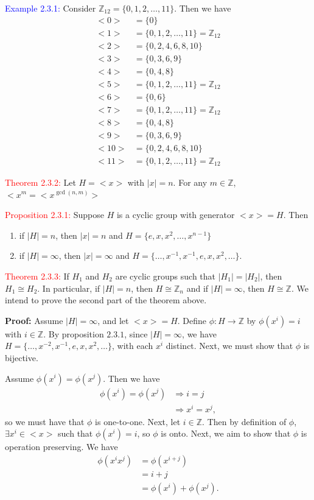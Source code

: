 \documentclass{article}
\begin{document}
\textcolor{blue}{Example 2.3.1:} Consider $\mathbb{Z}_{12} = \{0,1,2, \dots, 11\}$. Then we have
\begin{align*}
    <0> &= \{0\} \\
    <1> &= \{0,1,2, \dots, 11\} = \mathbb{Z}_{12} \\
    <2> &= \{0,2,4,6,8,10\} \\
    <3> &= \{0,3,6,9\} \\
    <4> &= \{0,4,8\} \\
    <5> &= \{0,1,2, \dots, 11\} = \mathbb{Z}_{12} \\
    <6> &= \{0,6\} \\
    <7> &= \{0,1,2, \dots, 11\} = \mathbb{Z}_{12} \\
    <8> &= \{0,4,8\} \\
    <9> &= \{0,3,6,9\} \\
    <10> &= \{0,2,4,6,8,10\} \\
    <11> &= \{0,1,2, \dots, 11\} = \mathbb{Z}_{12}
\end{align*}

\textcolor{red}{Theorem 2.3.2:} Let $H = <x>$ with $|x|=n$. For any $m \in \mathbb{Z}$, $<x^m = <x^{\gcd(n,m)}>$

\textcolor{red}{Proposition 2.3.1:} Suppose $H$ is a cyclic group with generator $<x>=H$. Then
\begin{enumerate}
    \item if $|H| = n$, then $|x| = n$ and $H = \{e,x,x^2, \dots, x^{n-1}\}$
    \item if $|H| = \infty$, then $|x| = \infty$ and $H = \{ \dots, x^{-1}, x^{-1}, e,x,x^2, \dots \}$.
\end{enumerate}

\textcolor{red}{Theorem 2.3.3:} If $H_1$ and $H_2$ are cyclic groups such that $|H_1|=|H_2|$, then $H_1 \cong H_2$. In particular, if 
$|H|=n$, then $H \cong \mathbb{Z}_n$ and if $|H| = \infty$, then $H \cong \mathbb{Z}$. We intend to prove the second part of the theorem 
above. 

\textbf{Proof:} Assume $|H| = \infty$, and let $<x> = H$. Define $\phi:H \longrightarrow \mathbb{Z}$ by $\phi(x^i)=i$ with $i \in \mathbb{Z}$. 
By proposition $2.3.1$, since $|H| = \infty$, we have $H = \{\dots, x^{-2}, x^{-1}, e,x,x^2, \dots \}$, with each $x^i$ distinct. Next, we 
must show that $\phi$ is bijective. 

Assume $\phi(x^i)=\phi(x^j)$. Then we have 
\begin{align*}
    \phi(x^i)=\phi(x^j) &\Longrightarrow i = j \\
    &\Longrightarrow x^i=x^j,
\end{align*} 
so we must have that $\phi$ is one-to-one. Next, let $i \in \mathbb{Z}$. Then by definition of $\phi$, $\exists x^i \in <x>$ such that 
$\phi(x^i)=i$, so $\phi$ is onto. Next, we aim to show that $\phi$ is operation preserving. We have
\begin{align*}
    \phi(x^ix^j) &= \phi(x^{i+j}) \\
    &= i+j \\
    &= \phi(x^i) + \phi(x^j).
\end{align*}
\end{document}

